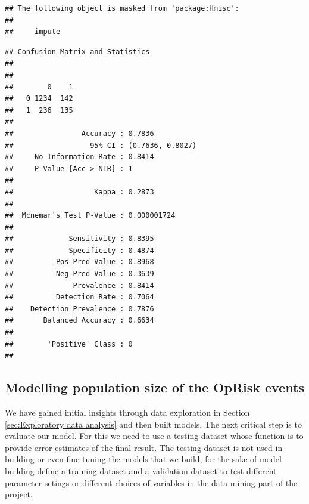 \documentclass[]{article}
\newenvironment{Shaded}{\begin{snugshade}}{\end{snugshade}}
\newcommand{\KeywordTok}[1]{\textcolor[rgb]{0.13,0.29,0.53}{\textbf{#1}}}
\newcommand{\NormalTok}[1]{#1}
\newcommand{\OperatorTok}[1]{\textcolor[rgb]{0.81,0.36,0.00}{\textbf{#1}}}
\newcommand{\StringTok}[1]{\textcolor[rgb]{0.31,0.60,0.02}{#1}}
\begin{document}
\begin{verbatim}
## The following object is masked from 'package:Hmisc':
## 
##     impute
\end{verbatim}

\begin{Shaded}
\end{Shaded}

\begin{verbatim}
## Confusion Matrix and Statistics
## 
##    
##        0    1
##   0 1234  142
##   1  236  135
##                                           
##                Accuracy : 0.7836          
##                  95% CI : (0.7636, 0.8027)
##     No Information Rate : 0.8414          
##     P-Value [Acc > NIR] : 1               
##                                           
##                   Kappa : 0.2873          
##                                           
##  Mcnemar's Test P-Value : 0.000001724     
##                                           
##             Sensitivity : 0.8395          
##             Specificity : 0.4874          
##          Pos Pred Value : 0.8968          
##          Neg Pred Value : 0.3639          
##              Prevalence : 0.8414          
##          Detection Rate : 0.7064          
##    Detection Prevalence : 0.7876          
##       Balanced Accuracy : 0.6634          
##                                           
##        'Positive' Class : 0               
## 
\end{verbatim}

\subsection{Modelling population size of the OpRisk events}

We have gained initial insights through data exploration in Section
\ref{sec:Exploratory data analysis} and then built models. The next
critical step is to evaluate our model. For this we need to use a
testing dataset whose function is to provide error estimates of the
final result. The testing dataset is not used in building or even fine
tuning the models that we build, for the sake of model building define a
training dataset and a validation dataset to test different parameter
setings or different choices of variables in the data mining part of the
project.\medskip
\end{document}
